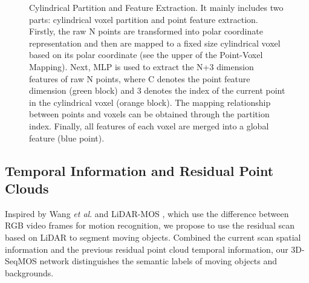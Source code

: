 \documentclass[lettersize,journal]{IEEEtran}
\begin{document}
\begin{figure}[t]
\centering
\vskip 0.2in
\caption{Cylindrical Partition and Feature Extraction. It mainly includes two parts: cylindrical voxel partition and point feature extraction. Firstly, the raw N points are transformed into polar coordinate representation and then are mapped to a fixed size cylindrical voxel based on its polar coordinate (see the upper of the Point-Voxel Mapping). Next, MLP is used to extract the N+3 dimension features of raw N points, where C denotes the point feature dimension (green block) and 3 denotes the index of the current point in the cylindrical voxel (orange block). The mapping relationship between points and voxels can be obtained through the partition index. Finally, all features of each voxel are merged into a global feature (blue point).}
\label{fig3}
\end{figure}

\subsection{Temporal Information and Residual Point Clouds}
Inspired by Wang \emph{et al}. \cite{wang2018temporal} and LiDAR-MOS \cite{chen2021moving}, which use the difference between RGB video frames for motion recognition, we propose to use the residual scan based on LiDAR to segment moving objects. Combined the current scan spatial information and the previous residual point cloud temporal information, our 3D-SeqMOS network distinguishes the semantic labels of moving objects and backgrounds.
\end{document}
